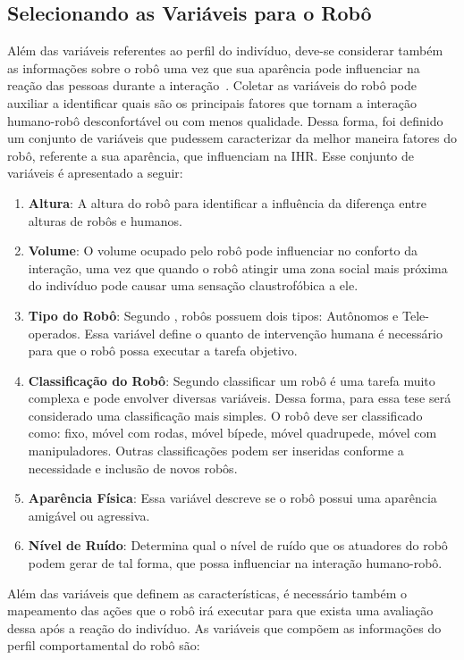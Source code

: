 \subsection{Selecionando as Variáveis para o Robô}
\label{sec:variaveisrobo}
Além das variáveis referentes ao perfil do indivíduo, deve-se considerar também as informações sobre o robô uma vez que sua aparência pode influenciar na reação das pessoas durante a interação~\cite{Hegel:2009}. Coletar as variáveis do robô pode auxiliar a identificar quais são os principais fatores que tornam a interação humano-robô desconfortável ou com menos qualidade. Dessa forma, foi definido um conjunto de variáveis que pudessem caracterizar da melhor maneira fatores do robô, referente a sua aparência, que influenciam na IHR. Esse conjunto de variáveis é apresentado a seguir:

\begin{enumerate}
	\item \textbf{Altura}: A altura do robô para identificar a influência da diferença entre alturas de robôs e humanos.
	\item \textbf{Volume}: O volume ocupado pelo robô pode influenciar no conforto da interação, uma vez que quando o robô atingir uma zona social mais próxima do indivíduo pode causar uma sensação claustrofóbica a ele.
	\item \textbf{Tipo do Robô}: Segundo , robôs possuem dois tipos: Autônomos e Tele-operados. Essa variável define o quanto de intervenção humana é necessário para que o robô possa executar a tarefa objetivo.
	\item \textbf{Classificação do Robô}: Segundo  classificar um robô é uma tarefa muito complexa e pode envolver diversas variáveis. Dessa forma, para essa tese será considerado uma classificação mais simples. O robô deve ser classificado como: fixo, móvel com rodas, móvel bípede, móvel quadrupede, móvel com manipuladores. Outras classificações podem ser inseridas conforme a necessidade e inclusão de novos robôs.
	\item \textbf{Aparência Física}: Essa variável descreve se o robô possui uma aparência amigável ou agressiva.
	\item \textbf{Nível de Ruído}: Determina qual o nível de ruído que os atuadores do robô podem gerar de tal forma, que possa influenciar na interação humano-robô.
\end{enumerate}

Além das variáveis que definem as características, é necessário também o mapeamento das ações que o robô irá executar para que exista uma avaliação dessa após a reação do indivíduo. As variáveis que compõem as informações do perfil comportamental do robô são:

